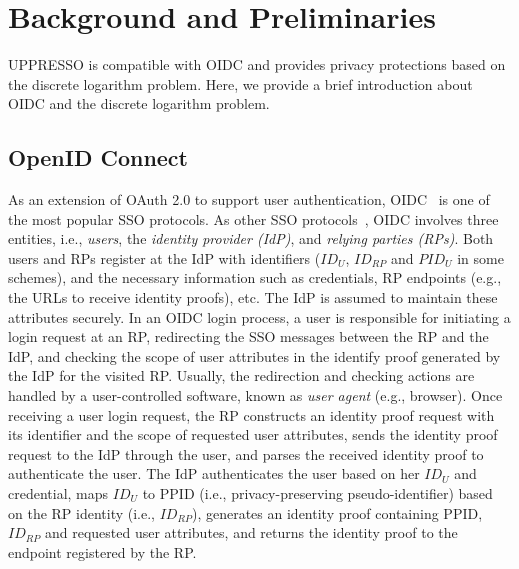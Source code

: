 \section{Background and Preliminaries}
\label{sec:background}
UPPRESSO is compatible with OIDC and provides privacy protections based on the discrete logarithm problem.
Here, we provide a brief introduction about OIDC and the discrete logarithm problem.

\subsection{OpenID Connect}
\label{subsec:OIDC}
As an extension of OAuth 2.0 to support user authentication, OIDC~\cite{OpenIDConnect} is one of the most popular SSO protocols.
As other SSO protocols~\cite{SAMLIdentifier}, OIDC involves three entities, i.e., {\em users}, the {\em identity provider (IdP)}, and {\em relying parties (RPs)}.
Both users and RPs register at the IdP with identifiers ($ID_U$, $ID_{RP}$ and $PID_U$ in some schemes),
   and the necessary information such as credentials, RP endpoints (e.g., the URLs to receive identity proofs), etc.
The IdP is assumed to maintain these attributes securely.
In an OIDC login process, a user is responsible for initiating a login request at an RP, redirecting the SSO messages between the RP and the IdP,
 and checking the scope of user attributes in the identify proof generated by the IdP for the visited RP.
Usually, the redirection and checking actions are handled by a user-controlled software,
 known as {\em user agent} (e.g., browser).
Once receiving a user login request, the RP constructs an identity proof request with its identifier and the scope of requested user attributes,
 sends the identity proof request to the IdP through the user, and parses the received identity proof to authenticate the user.
The IdP authenticates the user based on her $ID_U$ and credential,
 maps $ID_U$ to PPID (i.e., privacy-preserving pseudo-identifier) based on the RP identity (i.e., $ID_{RP}$),
 generates an identity proof containing PPID, $ID_{RP}$ and requested user attributes,
  and returns the identity proof to the endpoint registered by the RP.

